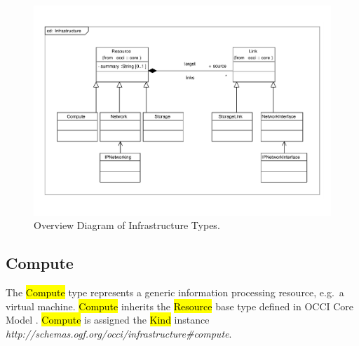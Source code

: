 \documentclass[10pt,a4paper]{article}
\begin{document}
\begin{figure}[!h]
	\centering
	\includegraphics[scale=0.3]{figs/infrastructure}
	\caption{Overview Diagram of Infrastructure Types.}
	\label{fig:infra_uml}
\end{figure}

\subsection{Compute}
The \hl{Compute} type represents a generic information processing resource, e.g.~a
virtual machine. \hl{Compute} inherits the \hl{Resource} base type defined in
OCCI Core Model \cite{occi:core}.
\hl{Compute} is assigned the \hl{Kind} instance
\textit{http://schemas.ogf.org/occi/infrastructure\#compute}.
\end{document}
